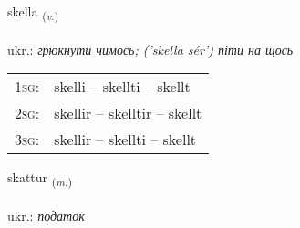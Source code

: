 \documentclass[frontgrid, backgrid]{flacards}\usepackage[]{graphicx}\usepackage[]{xcolor}
\begin{document}
\renewcommand{\flhead}{\vskip5pt \fboxsep=0pt {\small\bfseries\footnotesize Sagnorð | дієслово}}
\renewcommand{\fcfoot}{\vskip5pt \fboxsep=0pt \hspace{2pt}{\small\bfseries\footnotesize 2K}}

\renewcommand{\blhead}{\vskip5pt {\small\bfseries\footnotesize Sagnorð | дієслово }}
\renewcommand{\bcfoot}{\vskip5pt \hspace{2pt}{\small\bfseries\footnotesize 2K}}


{skella \small{\textsubscript{(\textit{v.})}} \\[1ex] %
\textphonetic{[scɛtla]} \\
ukr.: \emph{грюкнути чимось; ('skella sér') піти на щось} \\  [2ex]
\renewcommand*{\arraystretch}{0.8}
\begin{tabular}{p{1cm}l}
\textsc{1sg}: & skelli -- skellti -- skellt \\ 
\textsc{2sg}: & skellir -- skelltir -- skellt \\ 
\textsc{3sg}: & skellir -- skellti -- skellt \\ 
\end{tabular}
}

\renewcommand{\flhead}{\vskip5pt \fboxsep=0pt {\small\bfseries\footnotesize Nafnorð | іменник}}
\renewcommand{\fcfoot}{\vskip5pt \fboxsep=0pt \hspace{2pt}{\small\bfseries\footnotesize 2K}}

\renewcommand{\blhead}{\vskip5pt {\small\bfseries\footnotesize Nafnorð | іменник }}
\renewcommand{\bcfoot}{\vskip5pt \hspace{2pt}{\small\bfseries\footnotesize 2K}}


{skattur \small{\textsubscript{(\textit{m.})}} \\[1ex] %
\textphonetic{[skahtʏr]} \\
ukr.: \emph{податок} \\  [2ex]
\renewcommand*{\arraystretch}{0.8}
}
\end{document}
